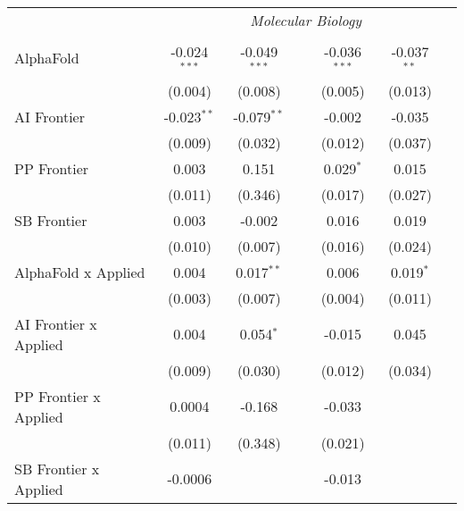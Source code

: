 \begin{tabular}{lcccccc}
 & \multicolumn{6}{c}{\textit{Molecular Biology}} \\ \\
   AlphaFold                      & -0.024$^{***}$ & -0.049$^{***}$ &                & -0.036$^{***}$ & -0.037$^{**}$ &   \\   
                                  & (0.004)        & (0.008)        &                & (0.005)        & (0.013)       &   \\   
   AI Frontier                    & -0.023$^{**}$  & -0.079$^{**}$  &                & -0.002         & -0.035        &   \\   
                                  & (0.009)        & (0.032)        &                & (0.012)        & (0.037)       &   \\   
   PP Frontier                    & 0.003          & 0.151          &                & 0.029$^{*}$    & 0.015         &   \\   
                                  & (0.011)        & (0.346)        &                & (0.017)        & (0.027)       &   \\   
   SB Frontier                    & 0.003          & -0.002         &                & 0.016          & 0.019         &   \\   
                                  & (0.010)        & (0.007)        &                & (0.016)        & (0.024)       &   \\   
   AlphaFold x Applied            & 0.004          & 0.017$^{**}$   &                & 0.006          & 0.019$^{*}$   &   \\   
                                  & (0.003)        & (0.007)        &                & (0.004)        & (0.011)       &   \\   
   AI Frontier x Applied          & 0.004          & 0.054$^{*}$    &                & -0.015         & 0.045         &   \\   
                                  & (0.009)        & (0.030)        &                & (0.012)        & (0.034)       &   \\   
   PP Frontier x Applied          & 0.0004         & -0.168         &                & -0.033         &               &   \\   
                                  & (0.011)        & (0.348)        &                & (0.021)        &               &   \\   
   SB Frontier x Applied          & -0.0006        &                &                & -0.013         &               &   \\   

\end{tabular}
